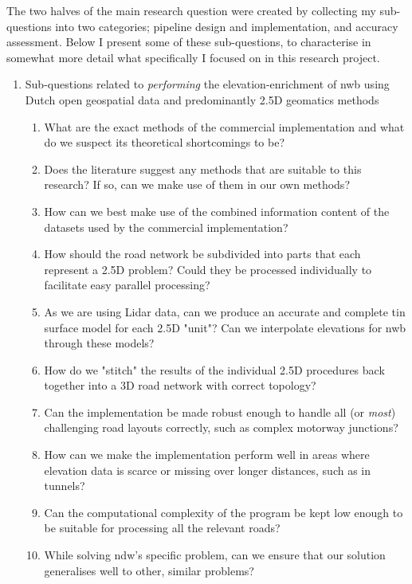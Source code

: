 The two halves of the main research question were created by collecting my sub-questions into two categories; pipeline design and implementation, and accuracy assessment. Below I present some of these sub-questions, to characterise in somewhat more detail what specifically I focused on in this research project.

\begin{enumerate}
    \item Sub-questions related to \textit{performing} the elevation-enrichment of \ac{nwb} using Dutch open geospatial data and predominantly 2.5D geomatics methods
    \begin{enumerate}
        \item What are the exact methods of the commercial implementation and what do we suspect its theoretical shortcomings to be?
        \item Does the literature suggest any methods that are suitable to this research? If so, can we make use of them in our own methods?
        \item How can we best make use of the combined information content of the datasets used by the commercial implementation?
        \item How should the road network be subdivided into parts that each represent a 2.5D problem? Could they be processed individually to facilitate easy parallel processing?
        \item As we are using Lidar data, can we produce an accurate and complete \ac{tin} surface model for each 2.5D "unit"? Can we interpolate elevations for \ac{nwb} through these models?
        \item How do we "stitch" the results of the individual 2.5D procedures back together into a 3D road network with correct topology?
        \item Can the implementation be made robust enough to handle all (or \textit{most}) challenging road layouts correctly, such as complex motorway junctions?
        \item How can we make the implementation perform well in areas where elevation data is scarce or missing over longer distances, such as in tunnels?
        \item Can the computational complexity of the program be kept low enough to be suitable for processing all the relevant roads?
        \item While solving \ac{ndw}'s specific problem, can we ensure that our solution generalises well to other, similar problems?
    \end{enumerate}

\end{enumerate}
